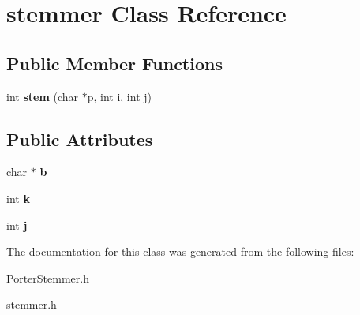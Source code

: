 \hypertarget{structstemmer}{\section{stemmer Class Reference}
\label{structstemmer}
}
\subsection*{Public Member Functions}
\begin{DoxyCompactItemize}
\item 
\hypertarget{structstemmer_aec9dbd0c95e05842aa62685ad39635f1}{int {\bfseries stem} (char $\ast$p, int i, int j)}\label{structstemmer_aec9dbd0c95e05842aa62685ad39635f1}

\end{DoxyCompactItemize}
\subsection*{Public Attributes}
\begin{DoxyCompactItemize}
\item 
\hypertarget{structstemmer_a0ae99db94786418a0c4d85a2a15382a5}{char $\ast$ {\bfseries b}}\label{structstemmer_a0ae99db94786418a0c4d85a2a15382a5}

\item 
\hypertarget{structstemmer_a587d5f8fd5c491688bc91e7d3b5e262e}{int {\bfseries k}}\label{structstemmer_a587d5f8fd5c491688bc91e7d3b5e262e}

\item 
\hypertarget{structstemmer_a024d42a47e06bd5207e2494cbfefbf2f}{int {\bfseries j}}\label{structstemmer_a024d42a47e06bd5207e2494cbfefbf2f}

\end{DoxyCompactItemize}


The documentation for this class was generated from the following files\+:\begin{DoxyCompactItemize}
\item 
Porter\+Stemmer.\+h\item 
stemmer.\+h\end{DoxyCompactItemize}
